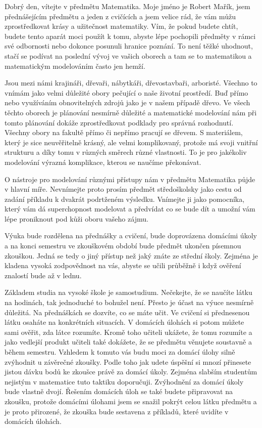 \documentclass[12pt]{article}
\begin{document}
Dobrý den, vítejte v předmětu Matematika. Moje jméno je Robert Mařík, jsem přednášejícím předmětu a jeden z cvičících a jsem velice rád, že vám můžu zprostředkovat krásy a užitečnost matematiky. Vím, že pokud budete chtít, budete tento aparát moci použít k tomu, abyste lépe pochopili předměty v rámci své odbornosti nebo dokonce posunuli hranice poznání. To není těžké uhodnout, stačí se podívat na poslední vývoj ve vašich oborech a tam se to matematikou a matematickým modelováním často jen hemží.

Jsou mezi námi krajináři, dřevaři, nábytkáři, dřevostavbaři, arboristé. Všechno to vnímám jako velmi důležité obory pečující o naše životní prostředí. Buď přímo nebo využíváním obnovitelných zdrojů jako je v našem případě dřevo. Ve všech těchto oborech je plánování nesmírně důležité a matematické modelování nám při tomto plánování dokáže zprostředkovat podklady pro správná rozhodnutí. Všechny obory na fakultě přímo či nepřímo pracují se dřevem. S materiálem, který je sice neuvěřitelně krásný, ale velmi komplikovaný, protože má svoji vnitřní strukturu a díky tomu v různých směrech různé vlastnosti. To je pro jakékoliv modelování výrazná komplikace, kterou se naučíme překonávat.

O nástroje pro modelování různými přístupy nám v předmětu Matematika půjde v hlavní míře. Nevnímejte proto prosím předmět středoškolsky jako cestu od zadání příkladu k dvakrát podrtženém výsledku. Vnímejte ji jako pomocníka, který vám dá superchopnost modelovat a předvídat co se bude dít a umožní vám lépe proniknout pod kůži oboru vašeho zájmu.

Výuka bude rozdělena na přednášky a cvičení, bude doprovázena domácími úkoly a na konci semestru ve zkouškovém období bude předmět ukončen písemnou zkouškou. Jedná se tedy o jiný přístup než jaký znáte ze střední školy. Zejména je kladena vysoká zodpovědnost na vás, abyste se učili průběžně i když ověření znalostí bude až v lednu.

Základem studia na vysoké škole je samostudium. Nečekejte, že se naučíte látku na hodinách, tak jednoduché to bohužel není. Přesto je účast na výuce nesmírně důležitá. Na přednáškách se dozvíte, co se máte učit. Ve cvičení si přednesenou látku osaháte na konkrétních situacích. V domácích úlohách si potom můžete sami ověřit, zda látce rozumíte. Kromě toho učiteli ukážete, že tomu rozumíte a jako vedlejší produkt učiteli také dokážete, že se předmětu věnujete soustavně a během semestru. Vzhledem k tomuto vás budu moci za domácí úlohy silně zvýhodnit u závěrečné zkoušky. Podle toho jak udete úspěšní si mnozí přinesete jistou dávku bodů ke zkoušce právě za domácí úkoly. Zejména slabším studentům nejistým v matematice tuto taktiku doporučuji. Zvýhodnění za domácí úkoly bude vlastně dvojí. Řešením domácích úloh se také budete připravovat na zkoušku, protože domácími úlohami jsem se snažil pokrýt celou látku předmětu a je proto přirozené, že zkouška bude sestavena z příkladů, které uvidíte v domácích úlohách.
\end{document}

